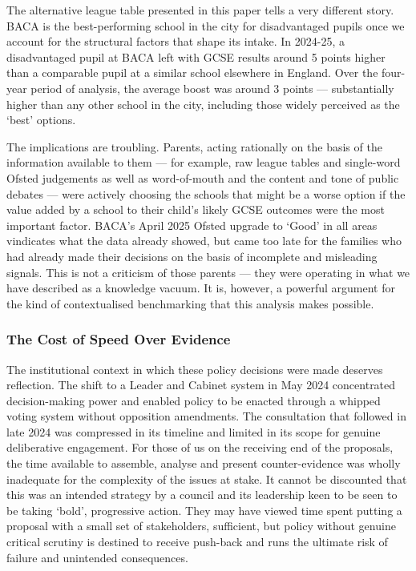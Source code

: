 \documentclass[
  11pt,
]{article}
\begin{document}
The alternative league table presented in this paper tells a very
different story. BACA is the best-performing school in the city for
disadvantaged pupils once we account for the structural factors that
shape its intake. In 2024-25, a disadvantaged pupil at BACA left with
GCSE results around 5 points higher than a comparable pupil at a similar
school elsewhere in England. Over the four-year period of analysis, the
average boost was around 3 points --- substantially higher than any
other school in the city, including those widely perceived as the `best'
options.

The implications are troubling. Parents, acting rationally on the basis
of the information available to them --- for example, raw league tables
and single-word Ofsted judgements as well as word-of-mouth and the
content and tone of public debates --- were actively choosing the
schools that might be a worse option if the value added by a school to
their child's likely GCSE outcomes were the most important factor.
BACA's April 2025 Ofsted upgrade to `Good' in all areas vindicates what
the data already showed, but came too late for the families who had
already made their decisions on the basis of incomplete and misleading
signals. This is not a criticism of those parents --- they were
operating in what we have described as a knowledge vacuum. It is,
however, a powerful argument for the kind of contextualised benchmarking
that this analysis makes possible.

\subsubsection{The Cost of Speed Over
Evidence}\label{the-cost-of-speed-over-evidence}

The institutional context in which these policy decisions were made
deserves reflection. The shift to a Leader and Cabinet system in May
2024 concentrated decision-making power and enabled policy to be enacted
through a whipped voting system without opposition amendments. The
consultation that followed in late 2024 was compressed in its timeline
and limited in its scope for genuine deliberative engagement. For those
of us on the receiving end of the proposals, the time available to
assemble, analyse and present counter-evidence was wholly inadequate for
the complexity of the issues at stake. It cannot be discounted that this
was an intended strategy by a council and its leadership keen to be seen
to be taking `bold', progressive action. They may have viewed time spent
putting a proposal with a small set of stakeholders, sufficient, but
policy without genuine critical scrutiny is destined to receive
push-back and runs the ultimate risk of failure and unintended
consequences.
\end{document}
